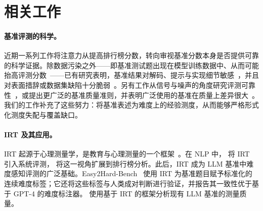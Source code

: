 \section{相关工作}

\paragraph{基准评测的科学。}
近期一系列工作将注意力从提高排行榜分数，转向审视基准分数本身是否提供可靠的科学证据。除数据污染之外——即基准测试题出现在模型训练数据中、从而可能抬高评测分数~\cite{oren2024proving,sun2025emperor,zhu2024dynamic}——已有研究表明，基准结果对解码、提示与实现细节敏感~\cite{hochlehnert2025sober}，并且对表面措辞或数据集缺陷十分脆弱~\cite{mousavi2026garbage}。另有工作从信号与噪声的角度研究评测可靠性~\cite{heineman2025signal}，或提出更广泛的基准质量准则，并表明广泛使用的基准在质量上差异很大~\cite{qian2026benchmark}。我们的工作补充了这些努力：将基准表述为难度上的经验测度，从而能够严格形式化测度失配与覆盖缺口。

\paragraph{IRT 及其应用。} IRT 起源于心理测量学，是教育与心理测量的一个框架~\cite{embretson2013item,lord2012applications}。在 NLP 中，\cite{lalor2016building} 将 IRT 引入系统评测，\cite{rodriguez2021evaluation} 将这一视角扩展到排行榜分析。此后，IRT 成为 LLM 基准中难度感知评测的广泛基础。Easy2Hard-Bench~\cite{ding2024easy2hard} 使用 IRT 为基准题目赋予标准化的连续难度标签；它还将这些标签与人类成对判断进行验证，并报告其一致性优于基于 GPT-4 的难度标注器。\cite{zhou2026lost} 使用基于 IRT 的框架分析现有 LLM 基准的测量质量。

